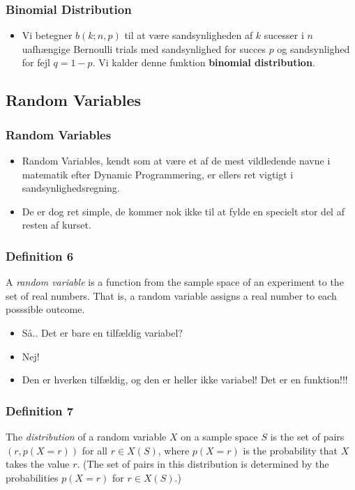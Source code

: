 \documentclass{beamer}
\begin{document}
\begin{frame}
  \frametitle{Binomial Distribution}
  \begin{itemize}
  \item Vi betegner $b(k;n,p)$ til at være sandsynligheden af $k$ sucesser i $n$ uafhængige Bernoulli trials med sandsynlighed for succes $p$ og sandsynlighed for fejl $q = 1-p$. Vi kalder denne funktion \textbf{binomial distribution}. 
  \end{itemize}
\end{frame}

\subsection{Random Variables}
\label{subsec:random-variables}

\begin{frame}
  \frametitle{Random Variables}
 \begin{itemize}
 \item Random Variables, kendt som at være et af de mest vildledende navne i matematik efter Dynamic Programmering, er ellers ret vigtigt i sandsynlighedsregning.
 \item De er dog ret simple, de kommer nok ikke til at fylde en specielt stor del af resten af kurset.
 \end{itemize} 
\end{frame}

\begin{frame}
  \frametitle{Definition 6}
 \begin{definition}
A \textit{random variable} is a function from the sample space of an experiment to the set of real numbers. That is, a random variable assigns a real number to each posssible outcome.
\end{definition}
\begin{itemize}
\item Så.. Det er bare en tilfældig variabel?
\item Nej!
\item Den er hverken tilfældig, og den er heller ikke variabel! Det er en funktion!!!
\end{itemize}
\end{frame}

\begin{frame}
  \frametitle{Definition 7}
  \begin{definition}
The \textit{distribution} of a random variable $X$ on a sample space $S$ is the set of pairs $(r, p(X=r))$  for all $r \in X(S)$, where $p(X=r)$ is the probability that $X$ takes the value $r$. (The set of pairs in this distribution is determined by the probabilities $p(X=r)$ for $r \in X(S)$.)
  \end{definition}
\end{frame}
\end{document}
